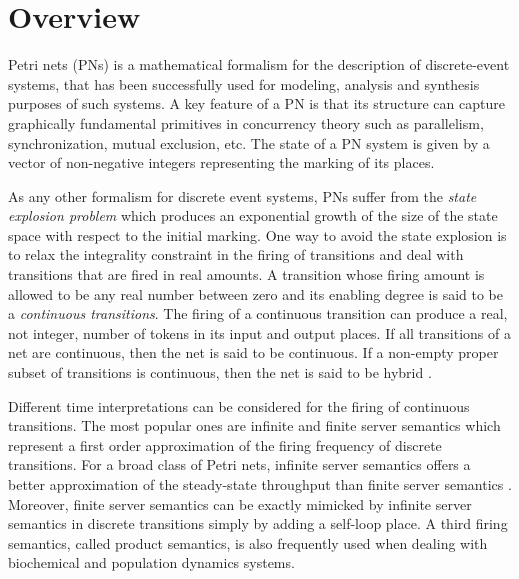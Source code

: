 
\chapter{Overview}


Petri nets (PNs)\cite{ARMura89,BODHPSV93} is a mathematical formalism for the description of discrete-event systems, that has been successfully used for modeling, analysis and synthesis purposes of such systems. A key feature of a
PN is that its structure can capture graphically fundamental primitives in concurrency theory such as parallelism,
synchronization, mutual exclusion, etc. The state of a PN system is given by a vector of non-negative
integers representing the marking of its places.

As any other formalism for discrete event systems, PNs suffer from the \emph{state explosion problem} which produces an exponential growth of the size of the state space with respect to the initial marking. One way to avoid the state explosion is to relax the integrality constraint in the firing of transitions and deal with transitions that are fired in real amounts. A transition whose firing amount is allowed to be any real number between zero and its enabling degree is said to be a \emph{continuous transitions}. The firing of a continuous transition can produce a real, not integer, number of tokens in its input and output places. If all transitions of a net are continuous, then the net is said to be continuous. If a non-empty proper subset of transitions is continuous, then the net is said to be hybrid \cite{BODavid10}.

Different time interpretations can be considered for the firing of continuous transitions. The most popular ones are infinite and finite server semantics which represent a first order approximation of the firing frequency of discrete transitions. For a broad class of Petri nets, infinite server semantics offers a better approximation of the steady-state throughput  than finite server semantics \cite{ARMARESI09}. Moreover, finite server semantics can be exactly mimicked by infinite server semantics in discrete transitions simply by adding a self-loop place. A third firing semantics, called product semantics, is also frequently used when dealing with biochemical and population dynamics systems.

